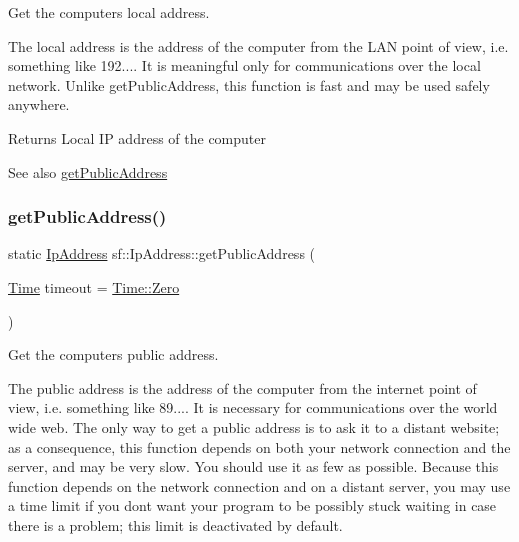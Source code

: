 Get the computer\textquotesingle{}s local address. 

The local address is the address of the computer from the L\+AN point of view, i.\+e. something like 192.... It is meaningful only for communications over the local network. Unlike get\+Public\+Address, this function is fast and may be used safely anywhere.

\begin{DoxyReturn}{Returns}
Local IP address of the computer
\end{DoxyReturn}
\begin{DoxySeeAlso}{See also}
\hyperlink{classsf_1_1_ip_address_a5c5cbf67e4aacf23c24f2ad991df4c55}{get\+Public\+Address} 
\end{DoxySeeAlso}
\mbox{\label{classsf_1_1_ip_address_a5c5cbf67e4aacf23c24f2ad991df4c55}} 
\subsubsection{\texorpdfstring{get\+Public\+Address()}{getPublicAddress()}}
{\footnotesize\ttfamily static \hyperlink{classsf_1_1_ip_address}{Ip\+Address} sf\+::\+Ip\+Address\+::get\+Public\+Address (\begin{DoxyParamCaption}\item[{\hyperlink{classsf_1_1_time}{Time}}]{timeout = {\ttfamily \hyperlink{classsf_1_1_time_a8db127b632fa8da21550e7282af11fa0}{Time\+::\+Zero}} }\end{DoxyParamCaption})\hspace{0.3cm}{\ttfamily [static]}}



Get the computer\textquotesingle{}s public address. 

The public address is the address of the computer from the internet point of view, i.\+e. something like 89.... It is necessary for communications over the world wide web. The only way to get a public address is to ask it to a distant website; as a consequence, this function depends on both your network connection and the server, and may be very slow. You should use it as few as possible. Because this function depends on the network connection and on a distant server, you may use a time limit if you don\textquotesingle{}t want your program to be possibly stuck waiting in case there is a problem; this limit is deactivated by default.


